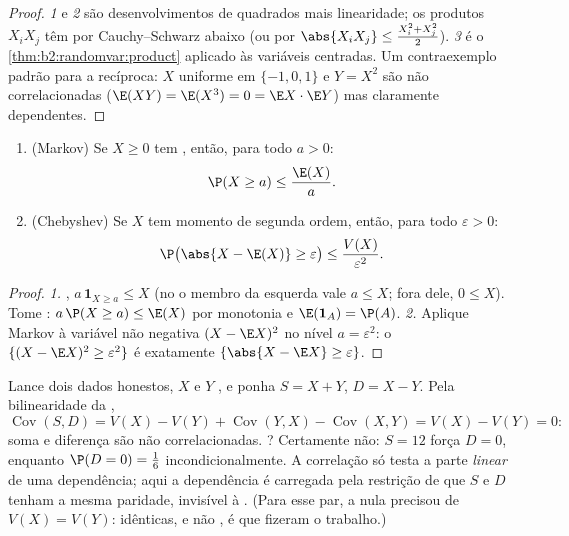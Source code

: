 \begin{proof}
\emph{1} e \emph{2} são desenvolvimentos de quadrados mais linearidade;
os produtos $X_iX_j$ têm  por Cauchy--Schwarz abaixo
(ou por $\abs{X_iX_j} \leq \frac{X_i^2 + X_j^2}{2}$). \emph{3} é o
\cref{thm:b2:randomvar:product} aplicado às variáveis
centradas. Um contraexemplo padrão para a recíproca: $X$ uniforme
em $\{-1, 0, 1\}$ e $Y = X^2$ são não correlacionadas
($\E(XY) = \E(X^3) = 0 = \E X \cdot \E Y$) mas claramente dependentes.
\end{proof}

\begin{theorem}\label{thm:b2:randomvar:markov}
\leavevmode
\begin{enumerate}
\item (Markov) Se $X \geq 0$ tem , então, para todo $a
> 0$:
\[
\P(X \geq a) \leq \frac{\E(X)}{a} .
\]
\item (Chebyshev) Se $X$ tem momento de segunda ordem, então, para todo
$\varepsilon > 0$:
\[
\P\bigl(\abs{X - \E(X)} \geq \varepsilon\bigr)
\leq \frac{V(X)}{\varepsilon^2} .
\]
\end{enumerate}
\end{theorem}

\begin{proof}
\emph{1.} , $a\,\mathbf{1}_{X \geq a} \leq X$ (no
 o membro da esquerda vale $a \leq X$; fora dele, $0 \leq X$). Tome
: $a\,\P(X \geq a) \leq \E(X)$ por monotonia e
$\E(\mathbf{1}_A) = \P(A)$.
\emph{2.} Aplique Markov à variável não negativa $(X - \E
X)^2$ no nível $a = \varepsilon^2$: o  $\{(X - \E X)^2
\geq \varepsilon^2\}$ é exatamente $\{\abs{X - \E X} \geq
\varepsilon\}$.
\end{proof}

\begin{example}\label{ex:b2:randomvar:sumdiff}
Lance dois dados honestos, $X$ e $Y$ , e ponha $S = X +
Y$, $D = X - Y$. Pela bilinearidade da ,
\[
\operatorname{Cov}(S, D) = V(X) - V(Y) +
\operatorname{Cov}(Y, X) - \operatorname{Cov}(X, Y) = V(X) -
V(Y) = 0 :
\]
soma e diferença são não correlacionadas. ? Certamente
não: $S = 12$ força $D = 0$, enquanto $\P(D = 0) =
\frac16$ incondicionalmente. A correlação só testa a
parte \emph{linear} de uma dependência; aqui a dependência é
carregada pela restrição de que $S$ e $D$ tenham a mesma
paridade, invisível à . (Para esse par, a
 nula precisou de $V(X) = V(Y)$:  idênticas,
e não , é que fizeram o trabalho.)
\end{example}

